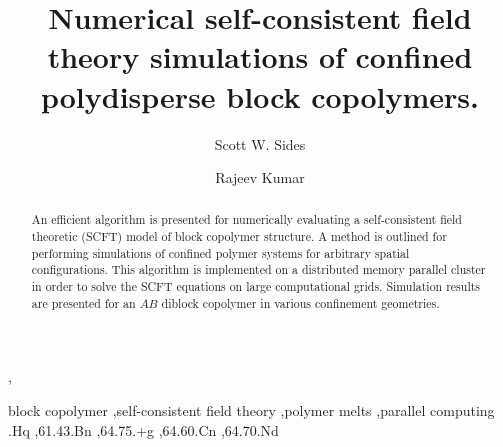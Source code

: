 \documentclass[onecolumn,amsmath,amssymb,floatfix]{elsart}
\begin{document}

\begin{frontmatter}


\title
{
Numerical self-consistent field theory
simulations of confined polydisperse block copolymers.
}



\author{Scott W. Sides},
\author{Rajeev Kumar}




\address
{
Oak Ridge National Labs (ORNL) Oak Ridge, TN \\
Tech-X Corporation Boulder, CO 80303
}


\begin{abstract}

An efficient algorithm is presented for numerically evaluating a
self-consistent field theoretic (SCFT) model of block copolymer
structure.
A method is outlined for performing simulations of confined polymer
systems for arbitrary spatial configurations.
This algorithm is implemented on a distributed memory
parallel cluster in order to solve the SCFT equations on large
computational grids.
Simulation results are presented for an $AB$ diblock
copolymer in various confinement geometries.


\end{abstract}

\begin{keyword}
block copolymer \sep self-consistent field theory \sep polymer melts \sep parallel computing
.Hq \sep 61.43.Bn \sep 64.75.+g \sep 64.60.Cn \sep 64.70.Nd
\end{keyword}





\end{frontmatter}
\end{document}
